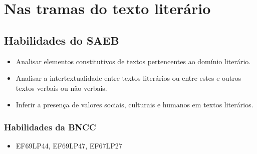 \chapter{Nas tramas do texto literário}

\section{Habilidades do SAEB}

\begin{itemize}
  
  \item Analisar elementos constitutivos de textos pertencentes ao domínio literário.
  
  \item Analisar a intertextualidade entre textos literários ou entre estes e outros textos 
verbais ou não verbais.
  
  \item Inferir a presença de valores sociais, culturais e humanos em textos literários.

\end{itemize}

\subsection{Habilidades da BNCC}

\begin{itemize}

  \item EF69LP44, EF69LP47, EF67LP27

\end{itemize}


